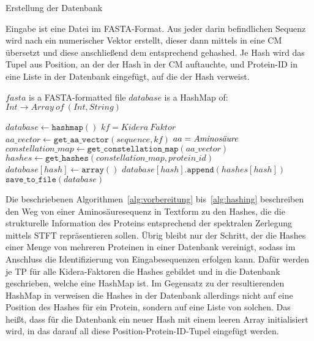         \begin{algorithm}[H]
            \caption{Erstellung der Datenbank}\label{alg:datenbank}
            Eingabe ist eine Datei im FASTA-Format. Aus jeder darin befindlichen Sequenz wird nach  ein numerischer Vektor erstellt, dieser dann mittels  in eine \acl{CM} übersetzt und diese anschließend dem  entsprechend gehashed. Je Hash wird das Tupel aus Position, an der der Hash in der \acl{CM} auftauchte, und Protein-ID in eine Liste in der Datenbank eingefügt, auf die der Hash verweist.
            \begin{algorithmic}[1]
                \Require $fasta$ is a FASTA-formatted file
                \Ensure $database$ is a HashMap of: $Int \rightarrow Array\ of\ (Int, String)$

                \State $database \gets \texttt{hashmap}()$
                     \Comment $kf=Kidera\ Faktor$
                        \State $aa\_vector \gets \texttt{get\_aa\_vector}(sequence, kf)$ \Comment $aa = \emph{Aminosäure}$
                        \State $constellation\_map \gets \texttt{get\_constellation\_map}(aa\_vector)$
                        \State $hashes \gets \texttt{get\_hashes}(constellation\_map, protein\_id)$
                                \State $database[hash] \gets \texttt{array}()$
                            \EndIf
                            \State $database[hash].\texttt{append}(hashes[hash])$
                        \EndFor
                    \EndFor
                \EndFor
                \State $\texttt{save\_to\_file}(database)$
            \end{algorithmic}
        \end{algorithm}

        Die beschriebenen Algorithmen~\ref{alg:vorbereitung} bis~\ref{alg:hashing} beschreiben den Weg von einer Aminosäuresequenz in Textform zu den Hashes, die die strukturelle Information des Proteins entsprechend der spektralen Zerlegung mittels \ac{STFT} repräsentieren sollen. Übrig bleibt nur der Schritt, der die Hashes einer Menge von mehreren Proteinen in einer Datenbank vereinigt, sodass im Anschluss die Identifizierung von Eingabesequenzen erfolgen kann. Dafür werden je \ac{TP} für alle Kidera-Faktoren die Hashes gebildet und in die Datenbank geschrieben, welche eine HashMap ist. Im Gegensatz zu der resultierenden HashMap in  verweisen die Hashes in der Datenbank allerdings nicht auf eine Position des Hashes für ein Protein, sondern auf eine Liste von solchen. Das heißt, dass für die Datenbank ein neuer Hash mit einem leeren Array initialisiert wird, in das darauf all diese Position-Protein-ID-Tupel eingefügt werden.

